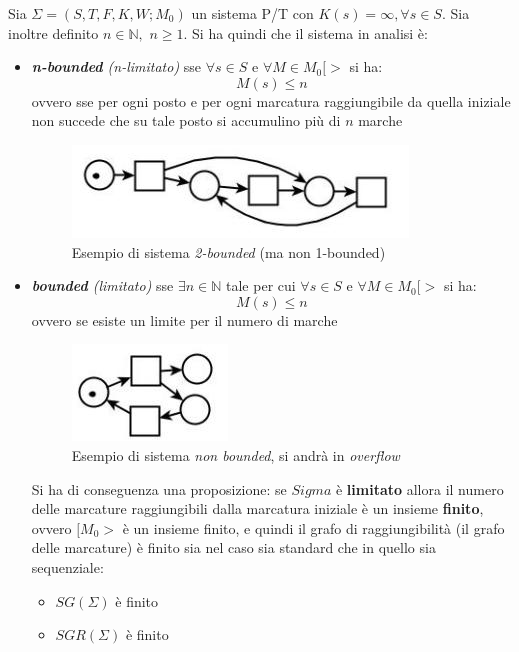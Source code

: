 \documentclass[a4paper,12pt, oneside]{book}
\begin{document}
\begin{definizione}
  Sia $\Sigma=(S,T,F,K,W;M_0)$ un sistema P/T con $K(s)=\infty,\forall s\in
  S$. Sia inoltre definito $n\in\mathbb{N},\,\,n\geq 1$. Si ha quindi che il
  sistema in analisi è:
  \begin{itemize}
    \item \textit{\textbf{n-bounded} (n-limitato)} sse $\forall s\in S$ e
    $\forall M\in 
    M_0[>$ si ha:
    \[M(s)\leq n\]
    ovvero sse per ogni posto e per ogni marcatura raggiungibile da quella
    iniziale non succede che su tale posto si accumulino più di $n$ marche
    \begin{figure}[H]
      \centering
      \includegraphics[scale = 0.55]{img/ptc4.jpg}
      \caption{Esempio di sistema \emph{2-bounded} (ma non 1-bounded)}
    \end{figure}
    \item \textit{\textbf{bounded} (limitato)} sse $\exists n\in\mathbb{N}$ tale
    per cui $\forall s\in S$ e $\forall M\in M_0[>$ si ha:
    \[M(s)\leq n\]
    ovvero se esiste un limite per il numero di marche
    \begin{figure}[H]
      \centering
      \includegraphics[scale = 0.55]{img/ptc5.jpg}
      \caption{Esempio di sistema \emph{non bounded}, si andrà in
        \emph{overflow}} 
    \end{figure}
    Si ha di conseguenza una proposizione:
    se $Sigma$ è \textbf{limitato} allora il numero delle marcature raggiungibili
    dalla marcatura iniziale è un insieme \textbf{finito}, ovvero $[M_0>$ è un
    insieme finito, e quindi il grafo di raggiungibilità (il grafo delle marcature)
    è finito sia nel caso sia standard che in quello sia sequenziale:
    \begin{itemize}
      \item $SG(\Sigma)$ è finito
      \item $SGR(\Sigma)$ è finito
    \end{itemize}

\end{itemize}
\end{definizione}
\end{document}
